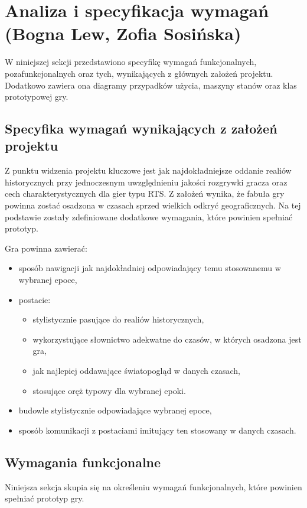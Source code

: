 \section{Analiza i specyfikacja wymagań (Bogna Lew, Zofia Sosińska)}\label{s:wymagania}
W niniejszej sekcji przedstawiono specyfikę wymagań funkcjonalnych, pozafunkcjonalnych oraz tych, wynikających z
głównych założeń projektu. Dodatkowo zawiera ona diagramy przypadków użycia, maszyny stanów oraz klas prototypowej gry.

\subsection{Specyfika wymagań wynikających z założeń projektu}
Z punktu widzenia projektu kluczowe jest jak najdokładniejsze oddanie realiów historycznych przy jednoczesnym
uwzględnieniu jakości rozgrywki gracza oraz cech charakterystycznych dla gier typu RTS. Z założeń wynika, że fabuła
gry powinna zostać osadzona w czasach sprzed wielkich odkryć geograficznych. Na tej podstawie zostały zdefiniowane
dodatkowe wymagania, które powinien spełniać prototyp.

Gra powinna zawierać:
\begin{itemize}
  \item sposób nawigacji jak najdokładniej odpowiadający temu stosowanemu w wybranej epoce,
  \item postacie:
  \begin{itemize}
    \item stylistycznie pasujące do realiów historycznych,
    \item wykorzystujące słownictwo adekwatne do czasów, w których osadzona jest gra,
    \item jak najlepiej oddawające światopogląd w danych czasach,
    \item stosujące oręż typowy dla wybranej epoki.
  \end{itemize}
  \item budowle stylistycznie odpowiadające wybranej epoce,
  \item sposób komunikacji z postaciami imitujący ten stosowany w danych czasach.
\end{itemize}

\subsection{Wymagania funkcjonalne}\label{ss:fun}
Niniejsza sekcja skupia się na określeniu wymagań funkcjonalnych, które powinien spełniać prototyp gry.

